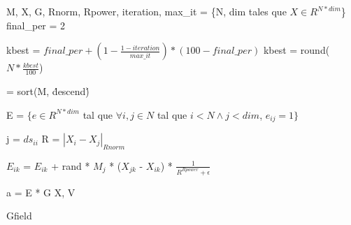 \documentclass{article}
\begin{document}
\begin{algorithm}
\begin{algorithmic}[1]
    \REQUIRE M, X, G, Rnorm, Rpower, iteration, max\_it
    \STATE [N, dim] = \{N, dim tales que $X \in R^{N * dim}$\}
    \STATE final\_per = 2

    \STATE kbest = $final\_per + (1 - \frac{1 - iteration}{max\_it}) * (100 - final\_per)$
    \STATE kbest = round($N * \frac{kbest}{100}$)

    \STATE [MS, ds] = sort(M, \'descend\')

    \STATE E = $\{e \in R^{N*dim}$ tal que $\forall i,j \in N$ tal que $i < N \wedge j < dim$, $e_{ij} = 1\}$

            \STATE j = $ds_{ii}$
                \STATE R = $|X_i - X_j|_{Rnorm}$

                    \STATE $E_{ik}$ = $E_{ik}$ + rand * $M_j$ * ($X_{jk}$ - $X_{ik}$) * $\frac{1}{R^{Rpower} + \epsilon}$
                \ENDFOR
            \ENDIF
        \ENDFOR
    \ENDFOR

    a = E * G
    \RETURN X, V
\end{algorithmic}
\caption{Gfield}
\end{algorithm}
\end{document}
